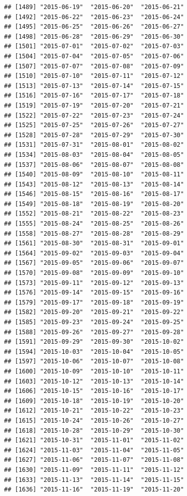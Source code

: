 \documentclass[10pt]{article}\usepackage[]{graphicx}\usepackage[]{color}
\makeatletter
\newenvironment{kframe}{%
 \def\at@end@of@kframe{}%
 \ifinner\ifhmode%
  \def\at@end@of@kframe{\end{minipage}}%
  \begin{minipage}{\columnwidth}%
 \fi\fi%
 \def\FrameCommand##1{\hskip\@totalleftmargin \hskip-\fboxsep
 \colorbox{shadecolor}{##1}\hskip-\fboxsep
     \hskip-\linewidth \hskip-\@totalleftmargin \hskip\columnwidth}%
 \MakeFramed {\advance\hsize-\width
   \@totalleftmargin\z@ \linewidth\hsize
   \@setminipage}}%
 {\par\unskip\endMakeFramed%
 \at@end@of@kframe}
\newenvironment{knitrout}{}{} %
\theoremstyle{plain}
\makeatother
\begin{document}
\begin{knitrout}
\begin{kframe}
\begin{verbatim}
## [1489] "2015-06-19"  "2015-06-20"  "2015-06-21" 
## [1492] "2015-06-22"  "2015-06-23"  "2015-06-24" 
## [1495] "2015-06-25"  "2015-06-26"  "2015-06-27" 
## [1498] "2015-06-28"  "2015-06-29"  "2015-06-30" 
## [1501] "2015-07-01"  "2015-07-02"  "2015-07-03" 
## [1504] "2015-07-04"  "2015-07-05"  "2015-07-06" 
## [1507] "2015-07-07"  "2015-07-08"  "2015-07-09" 
## [1510] "2015-07-10"  "2015-07-11"  "2015-07-12" 
## [1513] "2015-07-13"  "2015-07-14"  "2015-07-15" 
## [1516] "2015-07-16"  "2015-07-17"  "2015-07-18" 
## [1519] "2015-07-19"  "2015-07-20"  "2015-07-21" 
## [1522] "2015-07-22"  "2015-07-23"  "2015-07-24" 
## [1525] "2015-07-25"  "2015-07-26"  "2015-07-27" 
## [1528] "2015-07-28"  "2015-07-29"  "2015-07-30" 
## [1531] "2015-07-31"  "2015-08-01"  "2015-08-02" 
## [1534] "2015-08-03"  "2015-08-04"  "2015-08-05" 
## [1537] "2015-08-06"  "2015-08-07"  "2015-08-08" 
## [1540] "2015-08-09"  "2015-08-10"  "2015-08-11" 
## [1543] "2015-08-12"  "2015-08-13"  "2015-08-14" 
## [1546] "2015-08-15"  "2015-08-16"  "2015-08-17" 
## [1549] "2015-08-18"  "2015-08-19"  "2015-08-20" 
## [1552] "2015-08-21"  "2015-08-22"  "2015-08-23" 
## [1555] "2015-08-24"  "2015-08-25"  "2015-08-26" 
## [1558] "2015-08-27"  "2015-08-28"  "2015-08-29" 
## [1561] "2015-08-30"  "2015-08-31"  "2015-09-01" 
## [1564] "2015-09-02"  "2015-09-03"  "2015-09-04" 
## [1567] "2015-09-05"  "2015-09-06"  "2015-09-07" 
## [1570] "2015-09-08"  "2015-09-09"  "2015-09-10" 
## [1573] "2015-09-11"  "2015-09-12"  "2015-09-13" 
## [1576] "2015-09-14"  "2015-09-15"  "2015-09-16" 
## [1579] "2015-09-17"  "2015-09-18"  "2015-09-19" 
## [1582] "2015-09-20"  "2015-09-21"  "2015-09-22" 
## [1585] "2015-09-23"  "2015-09-24"  "2015-09-25" 
## [1588] "2015-09-26"  "2015-09-27"  "2015-09-28" 
## [1591] "2015-09-29"  "2015-09-30"  "2015-10-02" 
## [1594] "2015-10-03"  "2015-10-04"  "2015-10-05" 
## [1597] "2015-10-06"  "2015-10-07"  "2015-10-08" 
## [1600] "2015-10-09"  "2015-10-10"  "2015-10-11" 
## [1603] "2015-10-12"  "2015-10-13"  "2015-10-14" 
## [1606] "2015-10-15"  "2015-10-16"  "2015-10-17" 
## [1609] "2015-10-18"  "2015-10-19"  "2015-10-20" 
## [1612] "2015-10-21"  "2015-10-22"  "2015-10-23" 
## [1615] "2015-10-24"  "2015-10-26"  "2015-10-27" 
## [1618] "2015-10-28"  "2015-10-29"  "2015-10-30" 
## [1621] "2015-10-31"  "2015-11-01"  "2015-11-02" 
## [1624] "2015-11-03"  "2015-11-04"  "2015-11-05" 
## [1627] "2015-11-06"  "2015-11-07"  "2015-11-08" 
## [1630] "2015-11-09"  "2015-11-11"  "2015-11-12" 
## [1633] "2015-11-13"  "2015-11-14"  "2015-11-15" 
## [1636] "2015-11-16"  "2015-11-19"  "2015-11-20" 

\end{verbatim}
\end{kframe}
\end{knitrout}
\end{document}
